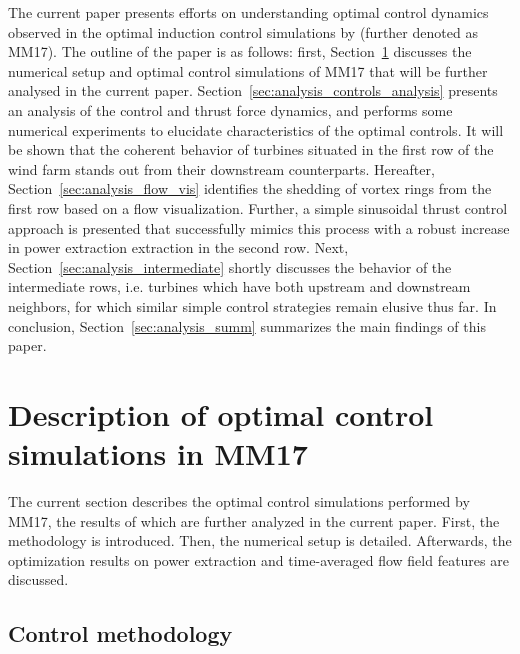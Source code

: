 \documentclass[wes, manuscript]{copernicus}
\begin{document}
The current paper presents efforts on understanding optimal control dynamics observed in the optimal induction control simulations by \cite{munters2017optimal} (further denoted as MM17). The outline of the paper is as follows: first, Section~\ref{sec:optimal_control_sims} discusses the numerical setup and optimal control simulations of MM17 that will be further analysed in the current paper. Section~\ref{sec:analysis_controls_analysis} presents an analysis of the control and thrust force dynamics, and performs some numerical experiments to elucidate characteristics of the optimal controls. It will be shown that the coherent behavior of turbines situated in the first row of the wind farm stands out from their downstream counterparts. Hereafter, Section~\ref{sec:analysis_flow_vis} identifies the shedding of vortex rings from the first row based on a flow visualization. Further, a simple sinusoidal thrust control approach is presented that successfully mimics this process with a robust increase in power extraction extraction in the second row. Next, Section~\ref{sec:analysis_intermediate} shortly discusses the behavior of the intermediate rows, i.e. turbines which have both upstream and downstream neighbors, for which similar simple control strategies remain elusive thus far. In conclusion, Section~\ref{sec:analysis_summ} summarizes the main findings of this paper.

\section{Description of optimal control simulations in MM17}\label{sec:optimal_control_sims}
The current section describes the optimal control simulations performed by MM17, the results of which are further analyzed in the current paper. First, the methodology is introduced. Then, the numerical setup is detailed. Afterwards, the optimization results on power extraction and time-averaged flow field features are discussed. 

\subsection{Control methodology}
\end{document}
